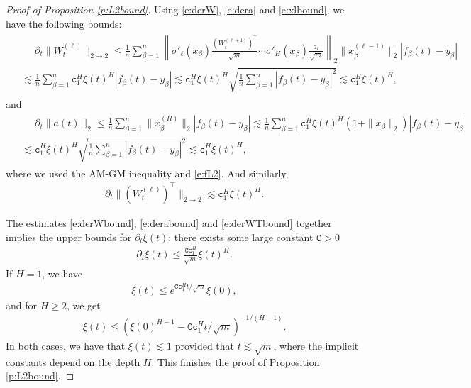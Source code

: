 \documentclass{article}
\numberwithin{equation}{section}
\newcommand{\fc}{{\mathtt c}}
\newcommand{\fC}{{\mathtt C}}
\renewcommand{\leq}{\leqslant}
\renewcommand{\geq}{\geqslant}
\newcommand{\del}{\partial}
\newcommand{\1}{\mathds{1}}
\theoremstyle{plain} %
\begin{document}
\begin{proof}[Proof of Proposition \ref{p:L2bound}]
Using \eqref{e:derW},  \eqref{e:dera}  and \eqref{e:xlbound}, we have the following  bounds: 
\begin{align}\begin{split}\label{e:derWbound}
&\phantom{{}={}}\del_t \|W^{(\ell)}_t\|_{2\rightarrow 2}
\leq \frac{1}{n}\sum_{\beta=1}^n\left\|\sigma'_\ell(x_\beta)\frac{(W_t^{(\ell+1)})^\top}{\sqrt m}\cdots \sigma'_{H}(x_\beta)\frac{a_t}{\sqrt m}\right\|_2 \|x_\beta^{(\ell-1)}\|_2|f_\beta(t)-y_\beta|\\
&
\lesssim \frac{1}{n}\sum_{\beta=1}^n \fc_1^{H} \xi(t)^{H} |f_\beta(t)-y_\beta|
\lesssim \fc_1^{H} \xi(t)^{H}\sqrt{\frac{1}{n}\sum_{\beta=1}^n  |f_\beta(t)-y_\beta|^2}
\lesssim \fc_1^{H} \xi(t)^{H},
\end{split}\end{align}
and
\begin{align}\label{e:derabound}\begin{split}
&\phantom{{}={}}\del_t \|a(t)\|_2\leq \frac{1}{n}\sum_{\beta =1}^n \|x_\beta^{(H)}\|_2|f_\beta(t)-y_\beta|
\lesssim \frac{1}{n}\sum_{\beta=1}^n \fc_1^{H} \xi(t)^{H}(1+\|x_\beta\|_2) |f_\beta(t)-y_\beta|\\
&\lesssim \fc_1^{H} \xi(t)^{H}\sqrt{\frac{1}{n}\sum_{\beta=1}^n  |f_\beta(t)-y_\beta|^2}
\lesssim \fc_1^{H} \xi(t)^{H},
\end{split}\end{align}
where we used the  AM-GM inequality and \eqref{e:fL2}. And similarly, 
\begin{align}\label{e:derWTbound}
\del_t \|(W^{(\ell)}_t)^\top\|_{2\rightarrow 2}\lesssim \fc_1^{H} \xi(t)^{H}.
\end{align}

The estimates \eqref{e:derWbound}, \eqref{e:derabound} and \eqref{e:derWTbound} together implies the upper bounds for $\del_t \xi(t)$: there exists some large constant $\fC>0$
\begin{align*}
\del_t\xi(t)\leq \frac{\fC \fc_1^{H}}{\sqrt m} \xi(t)^H.
\end{align*}
If $H=1$, we have 
\begin{align*}
\xi(t)\leq e^{\fC \fc_1^H t/\sqrt m}\xi(0),
\end{align*}
and for $H\geq 2$, we get
\begin{align*}
\xi(t)\leq \left(\xi(0)^{H-1}-\fC\fc_1^Ht/\sqrt m\right)^{-1/(H-1)}.
\end{align*}
In both cases, we have that $\xi(t)\lesssim 1$ provided that $t\lesssim \sqrt m$, where the implicit constants depend on the depth $H$. This finishes the proof of Proposition \ref{p:L2bound}.
\end{proof}
\end{document}
